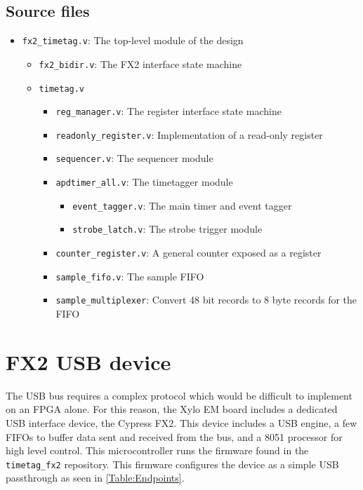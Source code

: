 \subsection{Source files}
\begin{itemize}
  \item {\tt fx2\_timetag.v}: The top-level module of the design
  \begin{itemize}
    \item {\tt fx2\_bidir.v}: The FX2 interface state machine
    \item {\tt timetag.v}
    \begin{itemize}
      \item {\tt reg\_manager.v}: The register interface state machine
      \item {\tt readonly\_register.v}: Implementation of a read-only register
      \item {\tt sequencer.v}: The sequencer module
      \item {\tt apdtimer\_all.v}: The timetagger module
      \begin{itemize}
        \item {\tt event\_tagger.v}: The main timer and event tagger
        \item {\tt strobe\_latch.v}: The strobe trigger module
      \end{itemize}
      \item {\tt counter\_register.v}: A general counter exposed as a register
      \item {\tt sample\_fifo.v}: The sample FIFO
      \item {\tt sample\_multiplexer}: Convert 48 bit records to 8 byte records for the FIFO
    \end{itemize}
  \end{itemize}
\end{itemize}

\section{FX2 USB device}
The USB bus requires a complex protocol which would be difficult to
implement on an FPGA alone. For this reason, the Xylo EM board
includes a dedicated USB interface device, the Cypress FX2. This
device includes a USB engine, a few FIFOs to buffer data sent and
received from the bus, and a 8051 processor for high level
control. This microcontroller runs the firmware found in the
{\tt timetag\_fx2} repository. This firmware configures the device as
a simple USB passthrough as seen in \ref{Table:Endpoints}.

